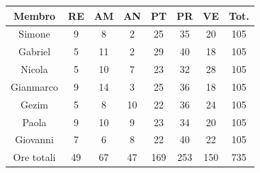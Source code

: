 \begin{center}
\begin{tabular}{ |c|c|c|c|c|c|c|c|  }
 \hline
 Membro 		& RE 		& AM 		& AN 	& PT 	& PR 	& VE 	& Tot.\\
 \hline\hline
 Simone			& 9  	 	& 8			& 2 		& 25 		& 35 		& 20 		& 105\\
 Gabriel		& 5 			& 11 		& 2 		& 29			& 40 		& 18 		& 105\\
 Nicola			& 5  		& 10 		& 7 		& 23 		& 32 		& 28 		& 105\\
 Gianmarco		& 9   		& 14 		& 3 		& 25		 	& 36 		& 18 		& 105\\
 Gezim			& 5  		& 8  		& 10		& 22 		& 36 		& 24	 	& 105\\
 Paola			& 9  		& 10 		& 9 		& 23 		& 34 		& 20 		& 105\\
 Giovanni		& 7  		& 6	 		& 8 		& 22 		& 40		 	& 22  		& 105\\
 \hline\hline
 Ore totali		& 49 	& 67		& 47 	& 169 	& 253 	& 150 	& 735\\
  \hline
\end{tabular}
\end{center}
